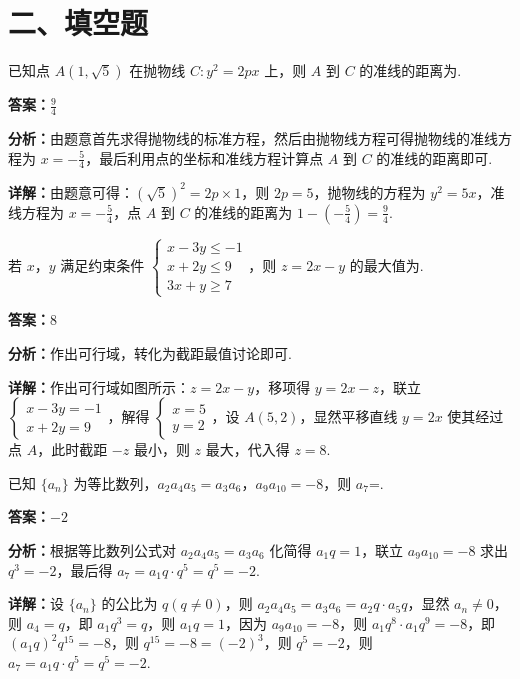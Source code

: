 \section*{二、填空题}

\begin{question}[points=5]
已知点 $A(1,\sqrt{5})$ 在抛物线 $C:y^2=2px$ 上，则 $A$ 到 $C$ 的准线的距离为.
\fillin[{$\frac{9}{4}$}]
\begin{solution}
\textbf{答案：}$\frac{9}{4}$

\textbf{分析：}由题意首先求得抛物线的标准方程，然后由抛物线方程可得抛物线的准线方程为 $x=-\frac{5}{4}$，最后利用点的坐标和准线方程计算点 $A$ 到 $C$ 的准线的距离即可.

\textbf{详解：}由题意可得：$(\sqrt{5})^2=2p\times1$，则 $2p=5$，抛物线的方程为 $y^2=5x$，准线方程为 $x=-\frac{5}{4}$，点 $A$ 到 $C$ 的准线的距离为 $1-(-\frac{5}{4})=\frac{9}{4}$.
\end{solution}
\end{question}

\begin{question}[points=5]
若 $x$，$y$ 满足约束条件 $\begin{cases} x-3y\le -1 \\ x+2y\le 9 \\ 3x+y\ge 7 \end{cases}$，则 $z=2x-y$ 的最大值为.
\fillin[{$8$}]
\begin{solution}
\textbf{答案：}$8$

\textbf{分析：}作出可行域，转化为截距最值讨论即可.

\textbf{详解：}作出可行域如图所示：$z=2x-y$，移项得 $y=2x-z$，联立 $\begin{cases} x-3y=-1 \\ x+2y=9 \end{cases}$，解得 $\begin{cases} x=5 \\ y=2 \end{cases}$，设 $A(5,2)$，显然平移直线 $y=2x$ 使其经过点 $A$，此时截距 $-z$ 最小，则 $z$ 最大，代入得 $z=8$.
\end{solution}
\end{question}

\begin{question}[points=5]
已知 $\{a_n\}$ 为等比数列，$a_2a_4a_5=a_3a_6$，$a_9a_{10}=-8$，则 $a_7$=.
\fillin[{$-2$}]
\begin{solution}
\textbf{答案：}$-2$

\textbf{分析：}根据等比数列公式对 $a_2a_4a_5=a_3a_6$ 化简得 $a_1q=1$，联立 $a_9a_{10}=-8$ 求出 $q^3=-2$，最后得 $a_7=a_1q\cdot q^5=q^5=-2$.

\textbf{详解：}设 $\{a_n\}$ 的公比为 $q(q\neq0)$，则 $a_2a_4a_5=a_3a_6=a_2q\cdot a_5q$，显然 $a_n\neq0$，则 $a_4=q$，即 $a_1q^3=q$，则 $a_1q=1$，因为 $a_9a_{10}=-8$，则 $a_1q^8\cdot a_1q^9=-8$，即 $(a_1q)^2 q^{15}=-8$，则 $q^{15}=-8=(-2)^3$，则 $q^5=-2$，则 $a_7=a_1q\cdot q^5=q^5=-2$.
\end{solution}
\end{question}

